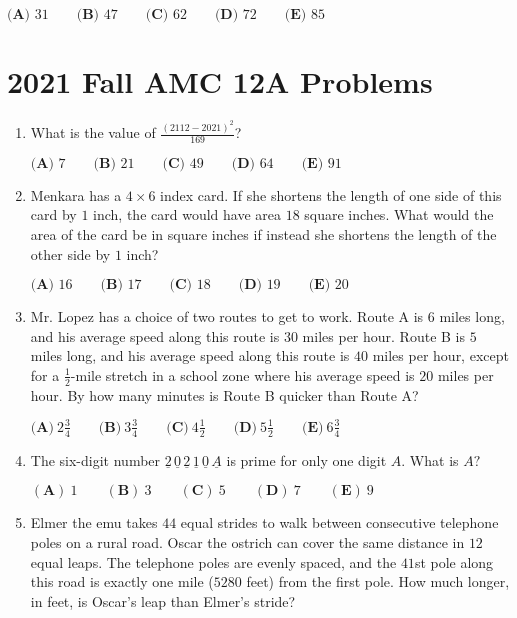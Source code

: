 \documentclass{article}
\begin{document}
\begin{enumerate}[label=\arabic*., itemsep=0.5em]
\(\textbf{(A) }31 \qquad \textbf{(B) }47 \qquad \textbf{(C) }62\qquad \textbf{(D) }72 \qquad \textbf{(E) }85\)\par \vspace{0.5em}\end{enumerate}\newpage\section*{2021 Fall AMC 12A Problems}
\begin{enumerate}[label=\arabic*., itemsep=0.5em]\item What is the value of \(\frac{(2112-2021)^2}{169}\)?

\(\textbf{(A) } 7 \qquad\textbf{(B) } 21 \qquad\textbf{(C) } 49 \qquad\textbf{(D) } 64 \qquad\textbf{(E) } 91\)\par \vspace{0.5em}\item Menkara has a \(4 \times 6\) index card. If she shortens the length of one side of this card by \(1\) inch, the card would have area \(18\) square inches. What would the area of the card be in square inches if instead she shortens the length of the other side by \(1\) inch?

\(\textbf{(A) }16\qquad\textbf{(B) }17\qquad\textbf{(C) }18\qquad\textbf{(D) }19\qquad\textbf{(E) }20\)\par \vspace{0.5em}\item Mr. Lopez has a choice of two routes to get to work. Route A is \(6\) miles long, and his average speed along this route is \(30\) miles per hour. Route B is \(5\) miles long, and his average speed along this route is \(40\) miles per hour, except for a \(\frac{1}{2}\)-mile stretch in a school zone where his average speed is \(20\) miles per hour. By how many minutes is Route B quicker than Route A?

\(\textbf{(A)}\ 2 \frac{3}{4}  \qquad\textbf{(B)}\  3 \frac{3}{4} \qquad\textbf{(C)}\  4 \frac{1}{2} \qquad\textbf{(D)}\
 5 \frac{1}{2} \qquad\textbf{(E)}\ 6 \frac{3}{4}\)\par \vspace{0.5em}\item The six-digit number \(\underline{2}\,\underline{0}\,\underline{2}\,\underline{1}\,\underline{0}\,\underline{A}\) is prime for only one digit \(A.\) What is \(A?\)

\((\textbf{A})\: 1\qquad(\textbf{B}) \: 3\qquad(\textbf{C}) \: 5 \qquad(\textbf{D}) \: 7\qquad(\textbf{E}) \: 9\)\par \vspace{0.5em}\item Elmer the emu takes \(44\) equal strides to walk between consecutive telephone poles on a rural road. Oscar the ostrich can cover the same distance in \(12\) equal leaps. The telephone poles are evenly spaced, and the \(41\)st pole along this road is exactly one mile (\(5280\) feet) from the first pole. How much longer, in feet, is Oscar's leap than Elmer's stride?


\end{enumerate}
\end{document}
